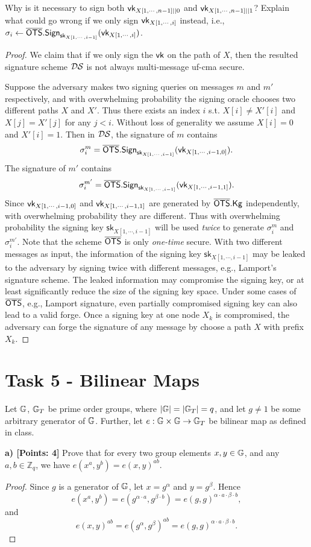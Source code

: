\documentclass[12pt]{article}
\newcommand{\Z}{\mathbb{Z}}
\theoremstyle{definition}
\newcommand{\Kg}{\textsf{Kg}}
\newcommand{\sk}{\textsf{sk}}
\begin{document}
Why is it necessary to sign both $\textsf{vk}_{X[1,\cdots,n-1]||0}$ and $\textsf{vk}_{X[1,\cdots,n-1]||1}$? Explain what could go wrong if we only sign $\textsf{vk}_{X[1,\cdots,i]}$ instead, i.e., $\sigma_i \gets \OTS.\Sign_{\sk_{X[1,\cdots,i-1]}}(\vk_{X[1,\cdots,i]})$.
\begin{proof}
We claim that if we only sign the $\textsf{vk}$ on the path of $X$, then the resulted signature scheme $\mathcal{DS}$ is not always multi-message uf-cma secure.

Suppose the adversary makes two signing queries on messages $m$ and $m'$ respectively, and with overwhelming probability the signing oracle chooses two different paths $X$ and $X'$. Thus there exists an index $i$ s.t. $X[i] \not= X'[i]$ and $X[j] = X'[j]$ for any $j<i$. Without loss of generality we assume $X[i]=0$ and $X'[i]=1$. Then in $\mathcal{DS}$, the signature of $m$ contains 
$$\sigma_i^m = \OTS.\Sign_{\sk_{X[1,\cdots,i-1]}}(\vk_{X[1,\cdots,i-1,0]}).$$
The signature of $m'$ contains
$$\sigma_i^{m'} = \OTS.\Sign_{\sk_{X[1,\cdots,i-1]}}(\vk_{X[1,\cdots,i-1,1]}).$$
Since $\textsf{vk}_{X[1,\cdots,i-1,0]}$ and $\textsf{vk}_{X[1,\cdots,i-1,1]}$ are generated by $\OTS.\Kg$ independently, with overwhelming probability they are different. Thus with overwhelming probability the signing key $\sk_{X[1,\cdots,i-1]}$ will be used \emph{twice} to generate $\sigma_i^m$ and $\sigma_i^{m'}$. Note that the scheme $\overline{\textsf{OTS}}$ is only \emph{one-time} secure. With two different messages as input, the information of the signing key $\sk_{X[1,\cdots,i-1]}$ may be leaked to the adversary by signing twice with different messages, e.g., Lamport's signature scheme. The leaked information may compromise the signing key, or at least significantly reduce the size of the signing key space. Under some cases of $\overline{\textsf{OTS}}$, e.g., Lamport signature, even partially compromised signing key can also lead to a valid forge. Once a signing key at one node $X_k$ is compromised, the adversary can forge the signature of any message by choose a path $X$ with prefix $X_k$. 
\end{proof}

\section{Task 5 - Bilinear Maps}
Let $\mathbb{G}$, $\mathbb{G}_T$ be prime order groups, where $|\mathbb{G}| = |\mathbb{G}_T| = q$, and let $g \not = 1$ be some arbitrary generator of $\mathbb{G}$. Further, let $e : \mathbb{G} \times \mathbb{G} \to \mathbb{G}_T$ be bilinear map as defined in class.

{\bf a) [Points: 4]} Prove that for every two group elements $x, y \in \mathbb{G}$, and any $a, b \in \Z_q$, we have $e(x^a, y^b) = e(x, y)^{ab}$.
\begin{proof}
Since $g$ is a generator of $\mathbb{G}$, let $x = g^{\alpha}$ and $y = g^{\beta}$. Hence
$$e(x^a, y^b) = e(g^{\alpha \cdot a}, g^{\beta \cdot b}) = e(g,g)^{\alpha \cdot a \cdot \beta \cdot b},$$
and 
$$e(x,y)^{ab} = e(g^{\alpha}, g^{\beta})^{ab} = e(g,g)^{\alpha \cdot a \cdot \beta \cdot b}.$$
\end{proof}
\end{document}
